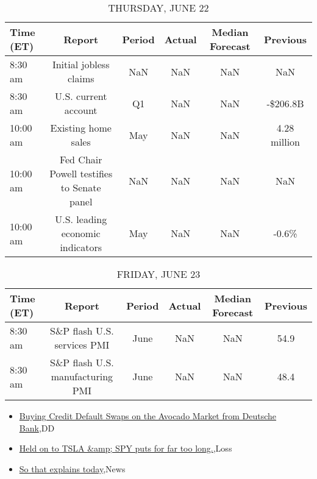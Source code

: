 \documentclass{article}%
\begin{document}
%


\begin{table}[htbp]%
\caption{THURSDAY, JUNE 22}%
\centering%
\begin{adjustbox}{width=1\textwidth}%
\begin{tabular}{lccccc}
\toprule
Time (ET) &                                     Report & Period & Actual & Median Forecast &     Previous \\
\midrule
  8:30 am &                     Initial jobless claims &    NaN &    NaN &             NaN &          NaN \\
  8:30 am &                       U.S. current account &     Q1 &    NaN &             NaN &     -\$206.8B \\
 10:00 am &                        Existing home sales &    May &    NaN &             NaN & 4.28 million \\
 10:00 am & Fed Chair Powell testifies to Senate panel &    NaN &    NaN &             NaN &          NaN \\
 10:00 am &           U.S. leading economic indicators &    May &    NaN &             NaN &        -0.6\% \\
\bottomrule
\end{tabular}
%
\end{adjustbox}%
\end{table}

%


\begin{table}[htbp]%
\caption{FRIDAY, JUNE 23}%
\centering%
\begin{adjustbox}{width=1\textwidth}%
\begin{tabular}{lccccc}
\toprule
Time (ET) &                           Report & Period & Actual & Median Forecast & Previous \\
\midrule
  8:30 am &      S\&P flash U.S. services PMI &   June &    NaN &             NaN &     54.9 \\
  8:30 am & S\&P flash U.S. manufacturing PMI &   June &    NaN &             NaN &     48.4 \\
\bottomrule
\end{tabular}
%
\end{adjustbox}%
\end{table}

%
\begin{itemize}%
\item%
\href{https://reddit.com/r/wallstreetbets/comments/14bmt7i/buying\_credit\_default\_swaps\_on\_the\_avocado\_market/}{Buying Credit Default Swaps on the Avocado Market from Deutsche Bank},DD%
\item%
\href{https://reddit.com/r/wallstreetbets/comments/14bhqd9/held\_on\_to\_tsla\_spy\_puts\_for\_far\_too\_long/}{Held on to TSLA \&amp; SPY puts for far too long.},Loss%
\item%
\href{https://reddit.com/r/StockMarket/comments/14bghwh/so\_that\_explains\_today/}{So that explains today},News%
\end{itemize}%
\end{document}
